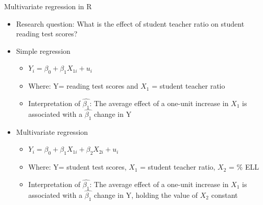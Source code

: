 \documentclass[8pt,ignorenonframetext,dvipsnames]{beamer}
\providecommand{\tightlist}{%
  \setlength{\itemsep}{0pt}\setlength{\parskip}{0pt}}
\let\olditem\item
\renewcommand{\item}{%
  \olditem\vspace{4pt}
}
\begin{document}
\begin{frame}{Multivariate regression in R}
\protect\hypertarget{multivariate-regression-in-r}{}

\begin{itemize}
\tightlist
\item
  Research question: What is the effect of student teacher ratio on
  student reading test scores?
\item
  Simple regression

  \begin{itemize}
  \tightlist
  \item
    \(Y_i = \beta_0 + \beta_1X_{1i} + u_i\)
  \item
    Where: Y= reading test scores and \(X_1\) = student teacher ratio
  \item
    Interpretation of \(\hat{\beta_1}\): The average effect of a
    one-unit increase in \(X_1\) is associated with a \(\hat{\beta_1}\)
    change in Y
  \end{itemize}
\item
  Multivariate regression

  \begin{itemize}
  \tightlist
  \item
    \(Y_i = \beta_0 + \beta_1X_{1i} + \beta_2X_{2i} + u_i\)
  \item
    Where: Y= student test scores, \(X_1\) = student teacher ratio,
    \(X_2\) = \% ELL
  \item
    Interpretation of \(\hat{\beta_1}\): The average effect of a
    one-unit increase in \(X_1\) is associated with a \(\hat{\beta_1}\)
    change in Y, holding the value of \(X_2\) constant
  \end{itemize}
\end{itemize}

\end{frame}
\end{document}
